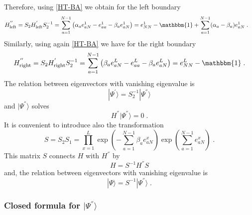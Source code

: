 \documentclass[10pt]{article}
\numberwithin{equation}{section}
\numberwithin{equation}{subsection}
\newcommand{\dt}{\;.}
\begin{document}
Therefore, using \eqref{HT-BA} we obtain for the left boundary 
\begin{equation}
	\begin{split}
		H_{\text{left}}^{''}&=S_{2}H_{\text{left}}^{'}S_{2}^{-1}
		=
		\sum_{a=1}^{N-1}\left(\alpha_{a}e_{aN}^{1}-e_{aa}^{1}-\beta_{a}e_{aN}^{1}\right)
		=
		e_{NN}^{1}-\mathbbm{1}+\sum_{a=1}^{N-1}(\alpha_{a}-\beta_{a})e_{aN}^{1}\dt
	\end{split}
\end{equation}
Similarly, using again \eqref{HT-BA} we have for the right boundary 
\begin{equation}
	\begin{split}
			H_{\text{right}}^{''}=S_{2}H_{\text{right}}^{'}S_{2}^{-1}
			=
			\sum_{a=1}^{N-1}\left(\beta_{a}e_{aN}^{L}-e_{aa}^{L}-\beta_{a}e_{aN}^{L}\right)=
			e_{NN}^{L}-\mathbbm{1}\dt
	\end{split}
\end{equation}
The relation between eigenvectors with vanishing eigenvalue is 
\begin{equation}\label{S2-Inverse}
	|\Psi^{'}\rangle = S_{2}^{-1}|\Psi^{''}\rangle
\end{equation}
and $|\Psi^{''}\rangle$ solves
\begin{equation}\label{steadyS-SECOND-def}
	H^{''}|\Psi^{''}\rangle=0\dt
\end{equation}
It is convenient to introduce also the transformation
\begin{equation}\label{similarity}
	S=S_{2}S_{1}=\prod_{x=1}^{L}\exp{\left(-\sum_{a=1}^{N-1}\beta_{a}e_{aN}^{x}\right)}\exp{\left(\sum_{a=1}^{N-1}e_{aN}^{x}\right)}\dt
\end{equation}
This matrix $S$ connects $H$ with $H^{''}$ by 
\begin{equation}
H=S^{-1}H^{''}S
\end{equation}
and, the relation between eigenvectors with vanishing eigenvalue is
\begin{equation}
	|\Psi\rangle=S^{-1}|\Psi^{''}\rangle\dt
\end{equation}


\subsubsection{Closed formula for $|\Psi^{''}\rangle$}\label{subsectionSSHsec}
\end{document}
